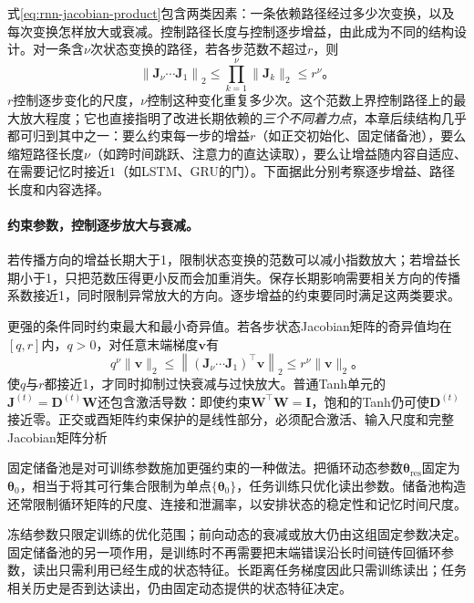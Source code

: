 式\eqref{eq:rnn-jacobian-product}包含两类因素：一条依赖路径经过多少次变换，以及每次变换怎样放大或衰减。控制路径长度与控制逐步增益，由此成为不同的结构设计。对一条含$\nu$次状态变换的路径，若各步范数不超过$r$，则
\begin{equation}
  \left\lVert\bm J_{\nu}\cdots\bm J_1\right\rVert_2
    \leq\prod_{k=1}^{\nu}\lVert\bm J_k\rVert_2\leq r^{\nu}\text{。}
  \label{eq:rnn-path-length-rate}
\end{equation}
$r$控制逐步变化的尺度，$\nu$控制这种变化重复多少次。这个范数上界控制路径上的最大放大程度；它也直接指明了改进长期依赖的\emph{三个不同着力点}，本章后续结构几乎都可归到其中之一：要么约束每一步的增益$r$（如正交初始化、固定储备池），要么缩短路径长度$\nu$（如跨时间跳跃、注意力的直达读取），要么让增益随内容自适应、在需要记忆时接近$1$（如LSTM、GRU的门）。下面据此分别考察逐步增益、路径长度和内容选择。

\paragraph{约束参数，控制逐步放大与衰减。}
\label{sec:rnn-parameter-constraints}

若传播方向的增益长期大于1，限制状态变换的范数可以减小指数放大；若增益长期小于1，只把范数压得更小反而会加重消失。保存长期影响需要相关方向的传播系数接近1，同时限制异常放大的方向。逐步增益的约束要同时满足这两类要求。

更强的条件同时约束最大和最小奇异值。若各步状态Jacobian矩阵的奇异值均在$[q,r]$内，$q>0$，对任意末端梯度$\bm v$有
\begin{equation}
  q^{\nu}\lVert\bm v\rVert_2
    \leq\left\lVert(\bm J_{\nu}\cdots\bm J_1)^{\top}\bm v\right\rVert_2
    \leq r^{\nu}\lVert\bm v\rVert_2\text{。}
  \label{eq:rnn-path-singular-bounds}
\end{equation}
使$q$与$r$都接近1，才同时抑制过快衰减与过快放大。普通Tanh单元的$\bm J^{(t)}=\bm D^{(t)}\bm W$还包含激活导数：即使约束$\bm W^{\top}\bm W=\bm I$，饱和的Tanh仍可使$\bm D^{(t)}$接近零。正交或酉矩阵约束保护的是线性部分，必须配合激活、输入尺度和完整Jacobian矩阵分析

固定储备池是对可训练参数施加更强约束的一种做法。把循环动态参数$\bm\theta_{\mathrm{res}}$固定为$\bm\theta_0$，相当于将其可行集合限制为单点$\{\bm\theta_0\}$，任务训练只优化读出参数。储备池构造还常限制循环矩阵的尺度、连接和泄漏率，以安排状态的稳定性和记忆时间尺度。

冻结参数只限定训练的优化范围；前向动态的衰减或放大仍由这组固定参数决定。固定储备池的另一项作用，是训练时不再需要把末端错误沿长时间链传回循环参数，读出只需利用已经生成的状态特征。长距离任务梯度因此只需训练读出；任务相关历史是否到达读出，仍由固定动态提供的状态特征决定。

